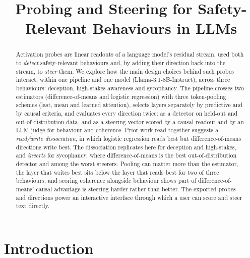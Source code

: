 \documentclass[conference]{IEEEtran}
\begin{document}
\title{Probing and Steering for Safety-Relevant Behaviours in LLMs}

\author{
}

\maketitle

\begin{abstract}
Activation probes are linear readouts of a language model's residual stream, used
both to \emph{detect} safety-relevant behaviours and, by adding their direction
back into the stream, to \emph{steer} them. We explore how the main design
choices behind such probes interact, within one pipeline and one model
(Llama-3.1-8B-Instruct), across three behaviours: deception, high-stakes
awareness and sycophancy. The pipeline crosses two estimators (difference-of-means
and logistic regression) with three token-pooling schemes (last, mean and learned
attention), selects layers separately by predictive and by causal criteria, and
evaluates every direction twice: as a detector on held-out and out-of-distribution
data, and as a steering vector scored by a causal readout and by an LLM judge for
behaviour and coherence. Prior work read together suggests a \emph{read/write
dissociation}, in which logistic regression reads best but difference-of-means
directions write best. The dissociation replicates here for deception and
high-stakes, and \emph{inverts} for sycophancy, where difference-of-means is the
best out-of-distribution detector and among the worst steerers. Pooling can matter
more than the estimator, the layer that writes best sits below the layer that reads
best for two of three behaviours, and scoring coherence alongside behaviour shows
part of difference-of-means' causal advantage is steering harder rather than
better. The exported probes and directions power an interactive interface through
which a user can score and steer text directly.
\end{abstract}

\section{Introduction}
\end{document}
